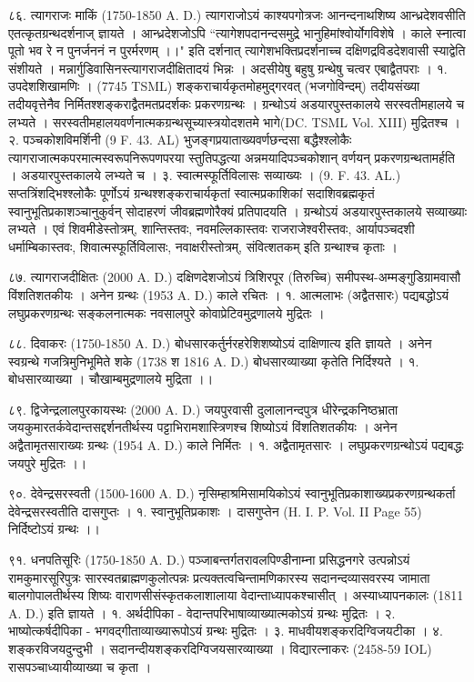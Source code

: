 ८६. त्यागराजः माकिं (1750-1850 A. D.)
त्यागराजोऽयं काश्यपगोत्रजः आनन्दनाथशिष्य आन्ध्रदेशवसीति एतत्कृतग्रन्थदर्शनाज् ज्ञायते । आन्ध्रदेशजोऽपि 
``त्यागेशपदानन्दसमुद्रे भानुहिमांश्वोर्योगविशेषे ।
काले स्नात्वा पूतो भव रे न पुनर्जननं न पुरर्मरणम् ।।"
इति दर्शनात् त्यागेशभक्तिप्रदर्शनाच्च दक्षिणद्रविडदेशवासी स्याद्वेति संशीयते ।
मन्नार्गुडिवासिनस्त्यागराजदीक्षितादयं भिन्नः । अदसीयेषु बहुषु ग्रन्थेषु चत्वर एबाद्वैतपराः ।
१. उपदेशशिखामणिः । (7745 TSML)
शङ्कराचार्यकृतमोहमुद्गरवत् (भजगोविन्दम्) तदीयसंख्या तदीयवृत्तेनैव निर्मितश्शङ्कराद्वैतमतप्रदर्शकः प्रकरणग्रन्थः । ग्रन्थोऽयं अडयारपुस्तकालये सरस्वतीमहालये च लभ्यते । सरस्वतीमहालयवर्णनात्मकग्रन्थसूच्यास्त्रयोदशतमे भागे(DC. TSML Vol. XIII) मुद्रितश्च ।
२. पञ्चकोशविमर्शिनी (9 F. 43. AL)
भुजङ्गप्रयाताख्यवर्णछन्दसा बद्धैश्श्लोकैः त्यागराजात्मकपरमात्मस्वरूपनिरूपणपरया स्तुतिपद्धत्या अन्नमयादिपञ्चकोशान् वर्णयन् प्रकरणग्रन्थतामर्हति । अडयारपुस्तकालये लभ्यते च ।
३. स्वात्मस्फूर्तिविलासः सव्याख्यः । (9. F. 43. AL.)
सप्तत्रिंशद्भिश्श्लोकैः पूर्णोऽयं ग्रन्थश्शङ्कराचार्यकृतां स्वात्मप्रकाशिकां सदाशिवब्रह्मकृतं स्वानुभूतिप्रकाशञ्चानुकुर्वन् सोदाहरणं जीवब्रह्मणोरैक्यं प्रतिपादयति । ग्रन्थोऽयं अडयारपुस्तकालये सव्याख्याः लभ्यते ।
एवं शिवमीडेस्तोत्रम्, शान्तिस्तवः, नवमल्लिकास्तवः राजराजेश्वरीस्तवः, आर्यापञ्चदशी धर्माम्बिकास्तवः, शिवात्मस्फूर्तिविलासः, नवाक्षरीस्तोत्रम्, संवित्शतकम् इति ग्रन्थाश्च कृताः ।

८७. त्यागराजदीक्षितः (2000 A. D.)
दक्षिणदेशजोऽयं त्रिशिरपूर (तिरुच्चि) समीपस्थ-अम्मङ्गुडिग्रामवासौ विंशतिशतकीयः । अनेन ग्रन्थः (1953 A. D.) काले रचितः ।
१. आत्मलाभः (अद्वैतसारः) पद्यबद्धोऽयं लघुप्रकरणग्रन्थः सङ्कलनात्मकः नवसालपुरे कोवाप्रेटिवमुद्रणालये मुद्रितः ।

८८. दिवाकरः (1750-1850 A. D.)
बोधसारकर्तुर्नरहरेशिशष्योऽयं दाक्षिणात्य इति ज्ञायते । अनेन स्वग्रन्थे गजत्रिमुनिभूमिते शके (1738 श 1816 A. D.) बोधसारव्याख्या कृतेति निर्दिश्यते ।
१. बोधसारव्याख्या । चौखाम्बमुद्रणालये मुद्रिता ।।

८९. द्विजेन्द्रलालपुरकायस्थः (2000 A. D.)
जयपुरवासी दुलालानन्दपुत्र धीरेन्द्रकनिष्ठभ्राता जयकुमारतर्कवेदान्तसद्दर्शनतीर्थस्य पट्टाभिरामशास्त्रिणश्च शिष्योऽयं विंशतिशतकीयः । अनेन अद्वैतामृतसाराख्यः ग्रन्थः (1954 A. D.) काले निर्मितः ।
१. अद्वैतामृतसारः । लघुप्रकरणग्रन्थोऽयं पद्यबद्धः जयपुरे मुद्रितः ।।

९०. देवेन्द्रसरस्वती (1500-1600 A. D.)
नृसिम्हाश्रमिसामयिकोऽयं स्वानुभूतिप्रकाशाख्यप्रकरणग्रन्थकर्ता देवेन्द्रसरस्वतीति दासगुप्तः ।
१. स्वानुभूतिप्रकाशः । दासगुप्तेन (H. I. P. Vol. II Page 55) निर्दिष्टोऽयं ग्रन्थः ।।

९१. धनपतिसूरिः (1750-1850 A. D.)
पञ्जाबन्तर्गतरावलपिण्डीनाम्ना प्रसिद्धनगरे उत्पन्नोऽयं रामकुमारसूरिपुत्रः सारस्वतब्राह्मणकुलोत्पन्नः प्रत्यक्तत्वचिन्तामणिकारस्य सदानन्दव्यासवरस्य जामाता बालगोपालतीर्थस्य शिष्यः वाराणसीसंस्कृतकलाशालाया वेदान्ताध्यापकश्चासीत् । अस्याध्यापनकालः (1811 A. D.) इति ज्ञायते ।
१. अर्थदीपिका - वेदान्तपरिभाषाव्याख्यात्मकोऽयं ग्रन्थः मुद्रितः ।
२. भाष्योत्कर्षदीपिका - भगवद्गीताव्याख्यारूपोऽयं ग्रन्थः मुद्रितः ।
३. माधवीयशङ्करदिग्विजयटीका ।
४. शङ्करविजयदुन्दुभी । सदानन्दीयशङ्करदिग्विजयसारव्याख्या । विद्यारत्नाकरः (2458-59 IOL) रासपञ्चाध्यायीव्याख्या च कृता ।

